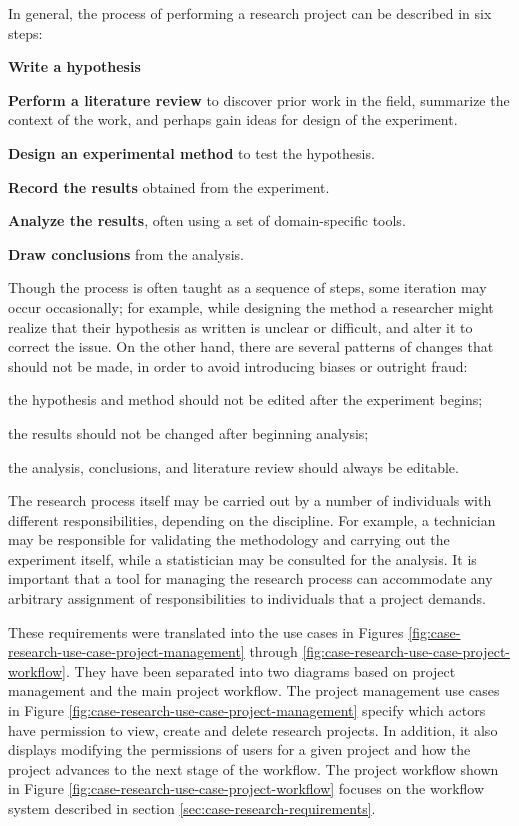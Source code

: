 \documentclass[document.tex]{subfiles}
\begin{document}
In general, the process of performing a research project can be described in six steps:
\begin{compactenum}
\item \textbf{Write a hypothesis}
\item \textbf{Perform a literature review} to discover prior work in the field, summarize the context of the work, and perhaps gain ideas for design of the experiment.
\item \textbf{Design an experimental method} to test the hypothesis.
\item \textbf{Record the results} obtained from the experiment.
\item \textbf{Analyze the results}, often using a set of domain-specific tools.
\item \textbf{Draw conclusions} from the analysis.
\end{compactenum}

Though the process is often taught as a sequence of steps, some iteration may occur occasionally; for example, while designing the method a researcher might realize that their hypothesis as written is unclear or difficult, and alter it to correct the issue. On the other hand, there are several patterns of changes that should not be made, in order to avoid introducing biases or outright fraud:
\begin{compactitem}
\item the hypothesis and method should not be edited after the experiment begins;
\item the results should not be changed after beginning analysis;
\item the analysis, conclusions, and literature review should always be editable.
\end{compactitem}

The research process itself may be carried out by a number of individuals with different responsibilities, depending on the discipline. For example, a technician may be responsible for validating the methodology and carrying out the experiment itself, while a statistician may be consulted for the analysis. It is important that a tool for managing the research process can accommodate any arbitrary assignment of responsibilities to individuals that a project demands.

These requirements were translated into the use cases in 
Figures \ref{fig:case-research-use-case-project-management} through \ref{fig:case-research-use-case-project-workflow}. They have been separated into two diagrams based on project management and the main project workflow. The project management use cases in Figure \ref{fig:case-research-use-case-project-management} specify which actors have permission to view, create and delete research projects. In addition, it also displays modifying the permissions of users for a given project and how the project advances to the next stage of the workflow. The project workflow shown in Figure \ref{fig:case-research-use-case-project-workflow} focuses on the workflow system described in section \ref{sec:case-research-requirements}.
\end{document}
